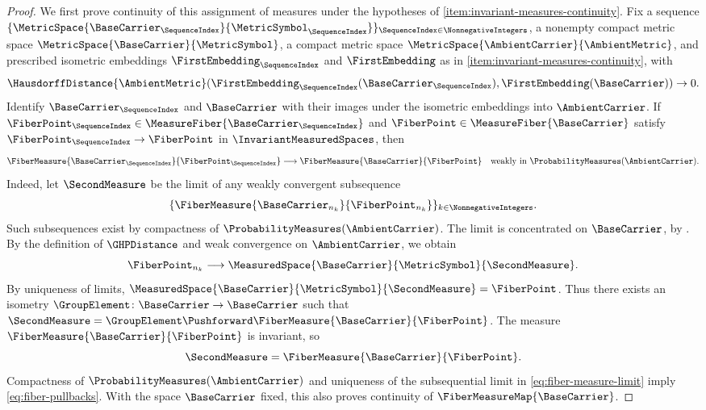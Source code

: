\begin{proof}
We first prove continuity of this assignment of measures under the hypotheses of \ref{item:invariant-measures-continuity}.
Fix a sequence
$\{\MetricSpace{\BaseCarrier_\SequenceIndex}{\MetricSymbol_\SequenceIndex}\}_{\SequenceIndex\in\NonnegativeIntegers}$,
a nonempty compact metric space
$\MetricSpace{\BaseCarrier}{\MetricSymbol}$,
a compact metric space
$\MetricSpace{\AmbientCarrier}{\AmbientMetric}$,
and prescribed isometric embeddings
$\FirstEmbedding_\SequenceIndex$
and
$\FirstEmbedding$
as in \ref{item:invariant-measures-continuity}, with
\[
 \HausdorffDistance{\AmbientMetric}(\FirstEmbedding_\SequenceIndex(\BaseCarrier_\SequenceIndex),\FirstEmbedding(\BaseCarrier))\to0.
\]
Identify
$\BaseCarrier_\SequenceIndex$
and
$\BaseCarrier$
with their images under the isometric embeddings into
$\AmbientCarrier$.
If
$\FiberPoint _\SequenceIndex \in\MeasureFiber{\BaseCarrier _\SequenceIndex }$
and
$\FiberPoint \in\MeasureFiber{\BaseCarrier }$
satisfy
$\FiberPoint _\SequenceIndex \to\FiberPoint $
in
$\InvariantMeasuredSpaces$,
then
\begin{equation}\label{eq:fiber-pullbacks}
 \FiberMeasure{\BaseCarrier _\SequenceIndex}{\FiberPoint _\SequenceIndex}\longrightarrow\FiberMeasure{\BaseCarrier}{\FiberPoint}
 \quad\text{weakly in }\ProbabilityMeasures(\AmbientCarrier ).
\end{equation}
Indeed,
let
$\SecondMeasure$
be the limit of any weakly convergent subsequence
\[
 \{\FiberMeasure{\BaseCarrier_{n_k}}{\FiberPoint_{n_k}}\}_{k\in\NonnegativeIntegers}.
\]
Such subsequences exist by compactness of
$\ProbabilityMeasures(\AmbientCarrier)$.
The limit is concentrated on
$\BaseCarrier $,
by .
By the definition of
$\GHPDistance$
and weak convergence on
$\AmbientCarrier $,
we obtain
\[
 \FiberPoint _{n_k} \longrightarrow\MeasuredSpace{\BaseCarrier }{\MetricSymbol }{\SecondMeasure }.
\]
By uniqueness of limits,
$\MeasuredSpace{\BaseCarrier }{\MetricSymbol }{\SecondMeasure }=\FiberPoint $.
Thus there exists an isometry
$\GroupElement\colon\BaseCarrier\to\BaseCarrier$
such that
$\SecondMeasure=\GroupElement\Pushforward\FiberMeasure{\BaseCarrier}{\FiberPoint}$.
The measure
$\FiberMeasure{\BaseCarrier}{\FiberPoint}$
is invariant,
so
\begin{equation}\label{eq:fiber-measure-limit}
 \SecondMeasure=\FiberMeasure{\BaseCarrier}{\FiberPoint}.
\end{equation}
Compactness of
$\ProbabilityMeasures(\AmbientCarrier)$
and uniqueness of the subsequential limit in
\eqref{eq:fiber-measure-limit} imply \eqref{eq:fiber-pullbacks}.
With the space
$\BaseCarrier $
fixed,
this also proves continuity of
$\FiberMeasureMap{\BaseCarrier }$.


\end{proof}
